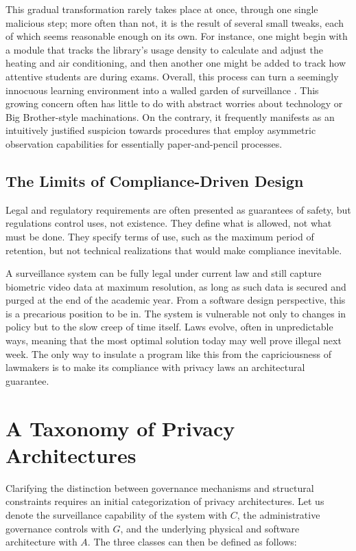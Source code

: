 \documentclass[conference]{IEEEtran}
\begin{document}
This gradual transformation rarely takes place at once, through one single malicious step; more often than not, it is the result of several small tweaks, each of which seems reasonable enough on its own. For instance, one might begin with a module that tracks the library's usage density to calculate and adjust the heating and air conditioning, and then another one might be added to track how attentive students are during exams. Overall, this process can turn a seemingly innocuous learning environment into a walled garden of surveillance \cite{b3}. This growing concern often has little to do with abstract worries about technology or Big Brother-style machinations. On the contrary, it frequently manifests as an intuitively justified suspicion towards procedures that employ asymmetric observation capabilities for essentially paper-and-pencil processes.

\subsection{The Limits of Compliance-Driven Design}
Legal and regulatory requirements are often presented as guarantees of safety, but regulations control uses, not existence. They define what is allowed, not what must be done. They specify terms of use, such as the maximum period of retention, but not technical realizations that would make compliance inevitable.

A surveillance system can be fully legal under current law and still capture biometric video data at maximum resolution, as long as such data is secured and purged at the end of the academic year. From a software design perspective, this is a precarious position to be in. The system is vulnerable not only to changes in policy but to the slow creep of time itself. Laws evolve, often in unpredictable ways, meaning that the most optimal solution today may well prove illegal next week. The only way to insulate a program like this from the capriciousness of lawmakers is to make its compliance with privacy laws an architectural guarantee.

\section{A Taxonomy of Privacy Architectures}

Clarifying the distinction between governance mechanisms and structural constraints requires an initial categorization of privacy architectures. Let us denote the surveillance capability of the system with $C$, the administrative governance controls with $G$, and the underlying physical and software architecture with $A$. The three classes can then be defined as follows:
\end{document}

